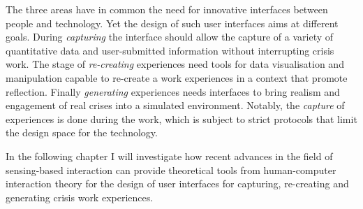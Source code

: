 The three areas have in common the need for innovative interfaces between people and technology. Yet the design of such user interfaces aims at different goals. During \emph{capturing} the interface should allow the capture of a variety of quantitative data and user-submitted information without interrupting crisis work. The stage of \emph{re-creating} experiences need tools for data visualisation and manipulation capable to re-create a work experiences in a context that promote reflection. Finally \emph{generating} experiences needs interfaces to bring realism and engagement of real crises into a simulated environment. Notably, the \emph{capture} of experiences is done during the work, which is subject to strict protocols that limit the design space for the technology.

In the following chapter I will investigate how recent advances in the field of sensing-based interaction can provide theoretical tools from human-computer interaction theory for the design of user interfaces for capturing, re-creating and generating crisis work experiences. 
